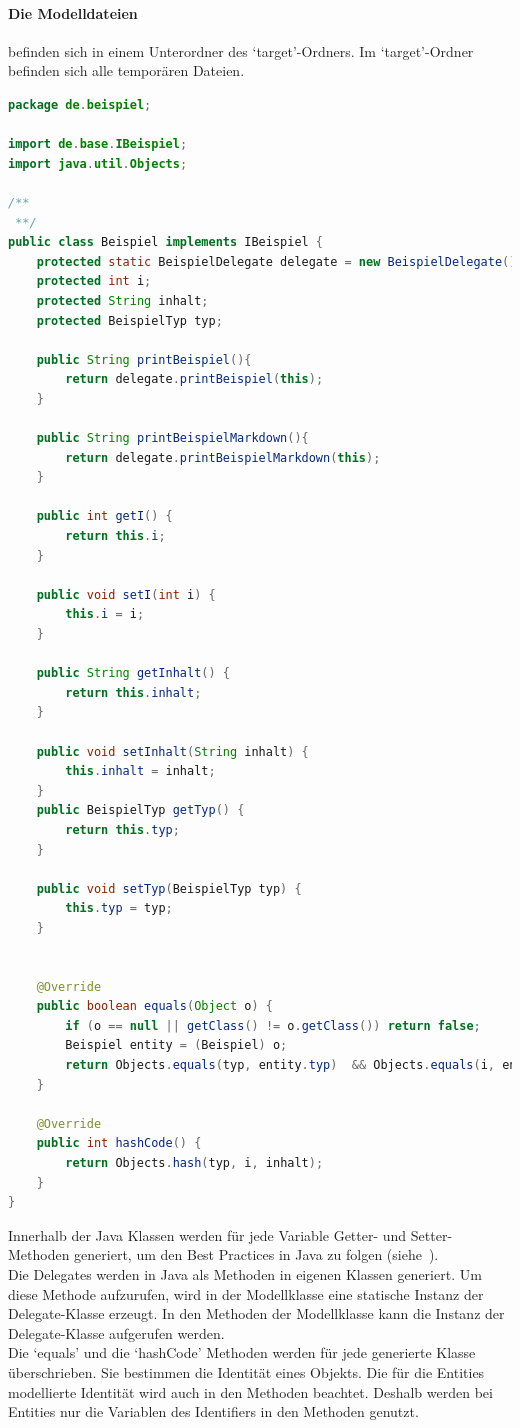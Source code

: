 \documentclass[./einleitung.tex]{subfiles}
\begin{document}
    \paragraph{Die Modelldateien} befinden sich in einem Unterordner des `target'-Ordners.
    Im `target'-Ordner befinden sich alle temporären Dateien.
    \begin{lstlisting}[language=Java, caption=Beispiel.java, label=lst:beispielJava]
package de.beispiel;

import de.base.IBeispiel;
import java.util.Objects;

/**
 **/
public class Beispiel implements IBeispiel {
    protected static BeispielDelegate delegate = new BeispielDelegate();
    protected int i;
    protected String inhalt;
    protected BeispielTyp typ;

    public String printBeispiel(){
        return delegate.printBeispiel(this);
    }

    public String printBeispielMarkdown(){
        return delegate.printBeispielMarkdown(this);
    }

    public int getI() {
        return this.i;
    }

    public void setI(int i) {
        this.i = i;
    }

    public String getInhalt() {
        return this.inhalt;
    }

    public void setInhalt(String inhalt) {
        this.inhalt = inhalt;
    }
    public BeispielTyp getTyp() {
        return this.typ;
    }

    public void setTyp(BeispielTyp typ) {
        this.typ = typ;
    }


    @Override
    public boolean equals(Object o) {
        if (o == null || getClass() != o.getClass()) return false;
        Beispiel entity = (Beispiel) o;
        return Objects.equals(typ, entity.typ)  && Objects.equals(i, entity.i)  && Objects.equals(inhalt, entity.inhalt) ;
    }

    @Override
    public int hashCode() {
        return Objects.hash(typ, i, inhalt);
    }
}
    \end{lstlisting}
    Innerhalb der Java Klassen werden für jede Variable Getter- und Setter-Methoden generiert, um den Best Practices in Java zu folgen (siehe~\cite{getterUndSetter}).\\
    Die Delegates werden in Java als Methoden in eigenen Klassen generiert.
    Um diese Methode aufzurufen, wird in der Modellklasse eine statische Instanz der Delegate-Klasse erzeugt.
    In den Methoden der Modellklasse kann die Instanz der Delegate-Klasse aufgerufen werden.\\
    Die `equals' und die `hashCode' Methoden werden für jede generierte Klasse überschrieben.
    Sie bestimmen die Identität eines Objekts.
    Die für die Entities modellierte Identität wird auch in den Methoden beachtet.
    Deshalb werden bei Entities nur die Variablen des Identifiers in den Methoden genutzt.
\end{document}
